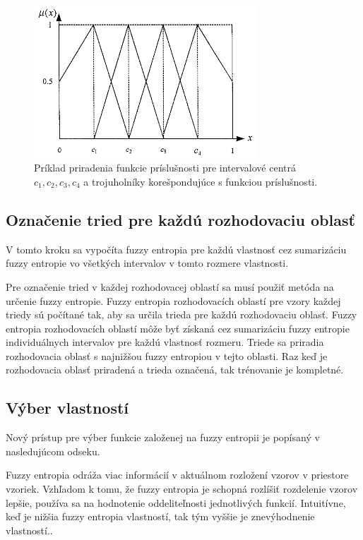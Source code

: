\begin{figure}[h]
\includegraphics[width=0.75\textwidth]{obrazky/prikladFunkciePrislusnosti4}
\centering
\caption{Príklad priradenia funkcie príslušnosti pre intervalové centrá $c_1, c_2, c_3, c_4$ a trojuholníky korešpondujúce s funkciou príslušnosti\cite{lee2001}.} 
\label{fig:prikladFunkciePrislusnosti}
\end{figure}

\subsection{Označenie tried pre každú rozhodovaciu oblasť}
 V tomto kroku sa vypočíta fuzzy entropia pre každú vlastnosť cez sumarizáciu fuzzy entropie vo všetkých intervalov v tomto rozmere vlastnosti.
 
 Pre označenie tried v každej rozhodovacej oblastí sa musí použiť metóda na určenie fuzzy entropie. Fuzzy entropia rozhodovacích oblastí pre vzory každej triedy sú počítané tak, aby sa určila trieda pre každú rozhodovaciu oblasť. Fuzzy entropia rozhodovacích oblastí môže byť získaná cez sumarizáciu fuzzy entropie individuálnych intervalov pre každú vlastnosť rozmeru. Triede sa priradia rozhodovacia oblasť s najnižšou fuzzy entropiou v tejto oblasti.  Raz keď je rozhodovacia oblasť priradená a trieda označená, tak trénovanie je kompletné\cite{lee2001}.

\subsection{Výber vlastností}
Nový prístup pre výber funkcie založenej na fuzzy entropii je popísaný v nasledujúcom odseku.

 Fuzzy entropia odráža viac informácií v aktuálnom rozložení vzorov v priestore vzoriek. Vzhľadom k tomu, že fuzzy entropia je schopná rozlíšiť rozdelenie vzorov lepšie, používa sa na hodnotenie oddeliteľnosti jednotlivých funkcií.  Intuitívne, keď je nižšia fuzzy entropia vlastností, tak tým vyššie je znevýhodnenie vlastností.\cite{lee2001}.

